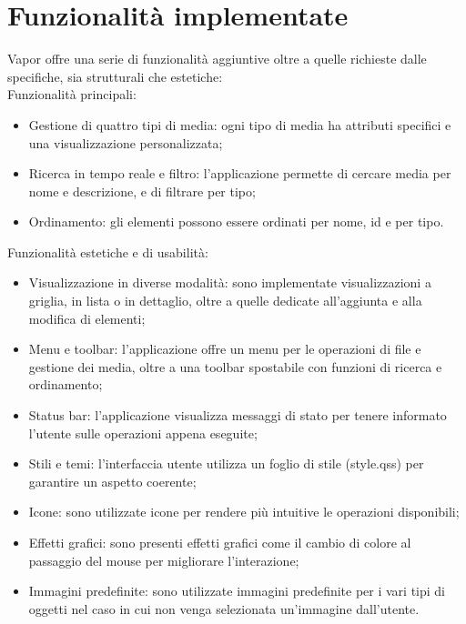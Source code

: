\documentclass[10pt]{article}
\begin{document}
\section{Funzionalità implementate}
Vapor offre una serie di funzionalità aggiuntive oltre a quelle richieste dalle specifiche, sia strutturali che estetiche:
\\Funzionalità principali:
\begin{itemize}
    \item Gestione di quattro tipi di media: ogni tipo di media ha attributi specifici e una visualizzazione personalizzata;
    \item Ricerca in tempo reale e filtro: l'applicazione permette di cercare media per nome e descrizione, e di filtrare per tipo;
    \item Ordinamento: gli elementi possono essere ordinati per nome, id e per tipo.
\end{itemize}
Funzionalità estetiche e di usabilità:
\begin{itemize}
    \item Visualizzazione in diverse modalità: sono implementate visualizzazioni a griglia, in lista o in dettaglio, oltre a quelle dedicate all'aggiunta e alla modifica di elementi;
    \item Menu e toolbar: l'applicazione offre un menu per le operazioni di file e gestione dei media, oltre a una toolbar spostabile con funzioni di ricerca e ordinamento;
    \item Status bar: l'applicazione visualizza messaggi di stato per tenere informato l'utente sulle operazioni appena eseguite;
    \item Stili e temi: l'interfaccia utente utilizza un foglio di stile (style.qss) per garantire un aspetto coerente;
    \item Icone: sono utilizzate icone per rendere più intuitive le operazioni disponibili;
    \item Effetti grafici: sono presenti effetti grafici come il cambio di colore al passaggio del mouse per migliorare l'interazione;
    \item Immagini predefinite: sono utilizzate immagini predefinite per i vari tipi di oggetti nel caso in cui non venga selezionata un'immagine dall'utente.
\end{itemize}
\end{document}
